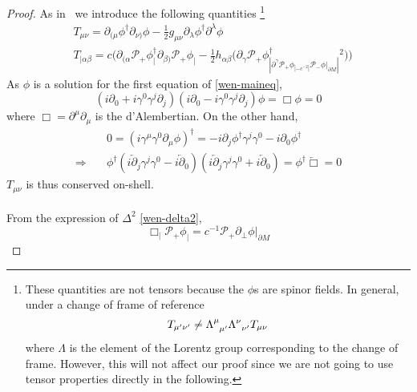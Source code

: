\begin{proof}
As in~\cite{Zahn2016} we introduce the following quantities
\footnote{
These quantities are not tensors because the $\phi$s are spinor fields. 
In general, under a change of frame of reference
\begin{equation*}
T_{\mu'\nu'} \neq \Lambda^\mu_{\enskip \mu'}\Lambda^\nu_{\enskip \nu'}T_{\mu \nu} 
\end{equation*}
where $\Lambda$ is the element of the Lorentz group corresponding to the change of frame.
However, 
this will not affect our proof since we are not going to use tensor properties directly in the following.
}
\begin{equation*}
\begin{split}
& T_{\mu\nu} = \partial_{(\mu} \phi^\dagger \partial_{\nu)} \phi - \frac{1}{2}g_{\mu\nu} \partial_\lambda\phi^\dagger\partial^\lambda\phi  \\
& T_{|\alpha\beta} = c\Big( \partial_{(\alpha}\mathcal{P}_+\phi^\dagger_| \partial_{\beta)}\mathcal{P}_+\phi_| - 
\frac{1}{2}h_{\alpha\beta}\big( \partial_\gamma\mathcal{P}_+\phi^\dagger_| \partial^\gamma\mathcal{P}_+\phi_|
 - c^{-2}|\mathcal{P}_- \phi\vert_{\partial M}|^2 \big)\Big) 
\end{split}
\end{equation*}
As $\phi$ is a solution for the first equation of \cref{wen-maineq},
\begin{equation*}
(i\partial_0 + i\gamma^0\gamma^j\partial_j)( i\partial_0 -i\gamma^0\gamma^j\partial_j)\phi  = 
\Box \phi= 0
\end{equation*}
where $\Box = \partial^\mu\partial_\mu$ is the d'Alembertian.
On the other hand, 
\begin{equation*}
\begin{split}
&0 = (i\gamma^\mu\gamma^0\partial_\mu\phi)^\dagger
= - i\partial_j\phi^\dagger\gamma^j\gamma^0 - i\partial_0\phi^\dagger \\
\Rightarrow \quad &
\phi^\dagger(i\overleftarrow{\partial}_j\gamma^j\gamma^0 - i\overleftarrow{\partial}_0)
(i\overleftarrow{\partial}_j\gamma^j\gamma^0 + i\overleftarrow{\partial}_0)
= \phi^\dagger \overleftarrow{\Box} = 0
\end{split}
\end{equation*}
$T_{\mu\nu}$ is thus conserved on-shell. \\\\
From the expression of $\Delta^2$ \cref{wen-delta2}, 
\begin{equation*}
\Box_|\mathcal{P}_+ \phi_| = c^{-1}\mathcal{P}_+\partial_\bot \phi\vert_{\partial M}

\end{equation*}
\end{proof}
